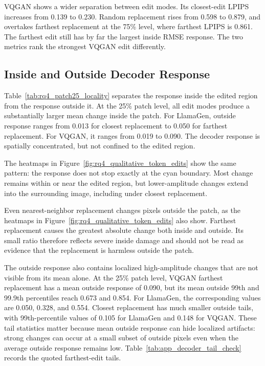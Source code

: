 VQGAN shows a wider separation between edit modes. Its closest-edit LPIPS
increases from 0.139 to 0.230. Random replacement rises from 0.598 to 0.879,
and overtakes farthest replacement at the 75\% level, where farthest LPIPS is
0.861. The farthest edit still has by far the largest inside RMSE response.
The two metrics rank the strongest VQGAN edit differently.

\subsection{Inside and Outside Decoder Response}
\label{subsec:rq4_inside_outside_results}

Table~\ref{tab:rq4_patch25_locality} separates the response inside the edited
region from the response outside it. At the 25\% patch level, all edit modes
produce a substantially larger mean change inside the patch. For LlamaGen,
outside response ranges from 0.013 for closest replacement to 0.050 for
farthest replacement. For VQGAN, it ranges from 0.019 to 0.090. The decoder
response is spatially concentrated, but not confined to the edited region.

The heatmaps in Figure~\ref{fig:rq4_qualitative_token_edits} show the same
pattern: the response does not stop exactly at the cyan boundary. Most change
remains within or near the edited region, but lower-amplitude changes extend
into the surrounding image, including under closest replacement.

Even nearest-neighbor replacement changes pixels outside the patch, as the
heatmaps in Figure~\ref{fig:rq4_qualitative_token_edits} also show. Farthest
replacement causes the greatest absolute change both inside and outside.
Its small ratio therefore reflects severe inside damage and should not be
read as evidence that the replacement is harmless outside the patch.

The outside response also contains localized high-amplitude changes that are
not visible from its mean alone. At the 25\% patch level, VQGAN farthest
replacement has a mean outside response of 0.090, but its mean outside 99th and
99.9th percentiles reach 0.673 and 0.854. For LlamaGen, the corresponding
values are 0.050, 0.328, and 0.554. Closest replacement has much smaller
outside tails, with 99th-percentile values of 0.105 for LlamaGen and 0.148 for
VQGAN. These tail statistics matter because mean outside response can hide
localized artifacts: strong changes can occur at a small subset of outside
pixels even when the average outside response remains low.
Table~\ref{tab:app_decoder_tail_check} records the quoted farthest-edit tails.

